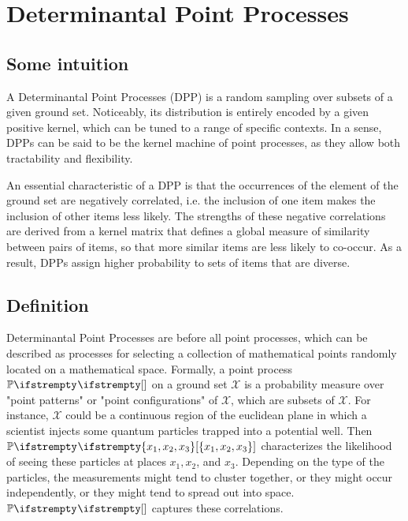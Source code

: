 \chapter{Determinantal Point Processes}


\section{Some intuition}

A Determinantal Point Processes (DPP) is a random sampling over subsets of a given ground set. Noticeably, its distribution is entirely encoded by a given positive kernel, which can be tuned to a range of specific contexts. In a sense, DPPs can be said to be the kernel machine of point processes, as they allow both tractability and flexibility. 

An essential characteristic of a DPP is that the occurrences of the element of the ground set are negatively correlated, i.e. the inclusion of one item makes the inclusion of other items less likely. The strengths of these negative correlations are derived from a kernel matrix that defines a global measure of similarity between pairs of items, so that more similar items are less likely to co-occur. As a result, DPPs assign higher probability to sets of items that are diverse.




\section{Definition}
Determinantal Point Processes are before all point processes, which can be described as processes for selecting a collection of mathematical points randomly located on a mathematical space. Formally, a point process $\PP{}{}$ on a ground set $\mathcal{X}$ is a probability measure over "point patterns" or "point configurations" of $\mathcal{X}$, which are subsets of $\mathcal{X}$. For instance, $\mathcal{X}$ could be a continuous region of the euclidean plane in which a scientist injects some quantum particles trapped into a potential well. Then $\PP{}{\left\{x_1, x_2, x_3\right\}}$ characterizes the likelihood of seeing these particles at places $x_1, x_2$, and $x_3$. Depending on the type of the particles, the measurements might tend to cluster together, or they might occur independently, or they might tend to spread out into space. $\PP{}{}$ captures these correlations.

